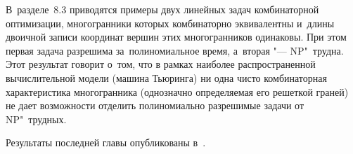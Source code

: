 В~разделе~8.3 приводятся примеры двух линейных задач комбинаторной оптимизации, многогранники которых комбинаторно эквивалентны 
и~длины двоичной записи координат вершин этих многогранников одинаковы. 
При этом первая задача разрешима за~полиномиальное время, 
а~вторая "--- NP"~трудна.
Этот результат говорит о~том, что 
в рамках наиболее распространенной вычислительной модели (машина Тьюринга) 
ни одна чисто комбинаторная характеристика многогранника
(однозначно определяемая его решеткой граней)
не дает возможности отделить полиномиально разрешимые задачи от NP"~трудных.

Результаты последней главы опубликованы в~.


